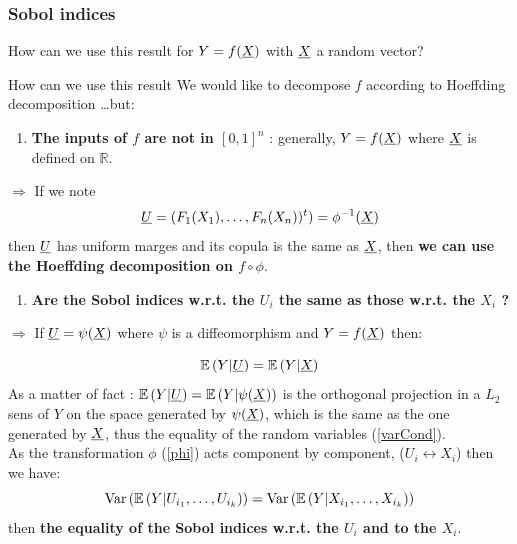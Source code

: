 \documentclass[8pt]{beamer}
\begin{document}
\begin{frame}
\frametitle{Sobol indices}
\small
How can we use this result for $Y = f({\underline{X}})$ with ${\underline{X}}$ a random vector?

\begin{block}{How can we use this result}
    \small
      We would like to decompose $f$ according to Hoeffding decomposition \dots but: \\
      \begin{enumerate}
      \item  \alert{\bf The inputs of $f$ are not in $[0,1]^n$} :  generally, $Y=f({\underline{X}})$ where  ${\underline{X}}$ is defined on $\mathbb{R}$.
      \end{enumerate}
      \alert{$\Longrightarrow$} If we note
       \begin{equation}
         \label{phi}
         {\underline{U}} = (F_1(X_1), \dots, F_n(X_n))^t) = \phi^{-1}({\underline{X}})
       \end{equation}
       then ${\underline{U}}$ has uniform marges and its copula is the same as ${\underline{X}}$, then {\bf we can use the Hoeffding decomposition on $f \circ \phi$}.

       \begin{enumerate}
       \item  \alert{\bf Are the Sobol indices w.r.t. the  $U_i$ the same as those w.r.t. the $X_i$ ?}
       \end{enumerate}
       \alert{$\Longrightarrow$} If ${\underline{U}} = \psi({\underline{X}})$ where $\psi$ is a diffeomorphism and $Y=f({\underline{X}})$ then:

       \begin{equation}
         \label{varCond}
         \mathbb{E}\left( Y|{\underline{U}} \right) = \mathbb{E}\left( Y|{\underline{X}} \right)
       \end{equation}
       As a matter of fact : $\mathbb{E}\left( Y|{\underline{U}} \right) = \mathbb{E}\left( Y|\psi({\underline{X}}) \right)$ is the orthogonal projection in a $L_2$ sens of $Y$ on the space generated by $\psi({\underline{X}})$, which is the same as the one generated by ${\underline{X}}$, thus the equality of the random variables  (\ref{varCond}).\\
       As the transformation $\phi$ (\ref{phi}) acts component by component, ($U_i \leftrightarrow X_i$) then we have:
       \begin{equation}
         \label{varCond2}
         \mbox{Var}\left( \mathbb{E}\left( Y|U_{i_1}, \dots, U_{i_k} \right) \right) = \mbox{Var}\left( \mathbb{E}\left( Y|X_{i_1}, \dots, X_{i_k} \right) \right)
       \end{equation}
       then {\bf the equality of the Sobol indices w.r.t. the  $U_i$ and to the  $X_i$}.
  \end{block}

\end{frame}
\end{document}
